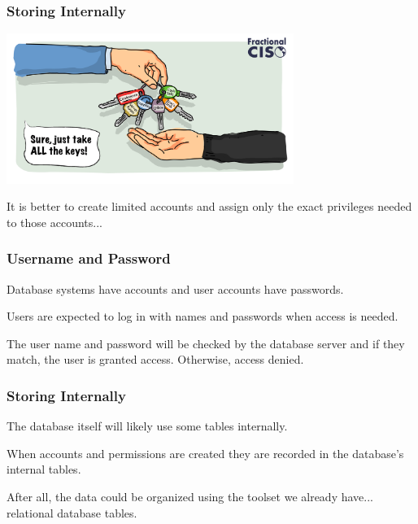 \begin{frame}
\frametitle{Storing Internally}

\begin{center}
	\includegraphics[width=0.7\textwidth]{images/least-privilege.png}
\end{center}

It is better to create limited accounts and assign only the exact privileges needed to those accounts...

\end{frame}



\begin{frame}
\frametitle{Username and Password}

Database systems have accounts and user accounts have passwords. 

Users are expected to log in with names and passwords when access is needed. 

The user name and password will be checked by the database server and if they match, the user is granted access. Otherwise, access denied.


\end{frame}


\begin{frame}
\frametitle{Storing Internally}

The database itself will likely use some tables internally.

When accounts and permissions are created they are recorded in the database's internal tables. 

After all, the data could be organized using the toolset we already have... relational database tables. 



\end{frame}



